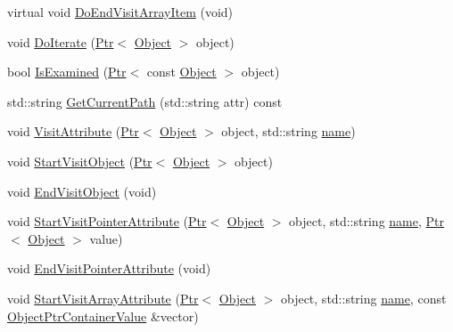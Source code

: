 \begin{DoxyCompactItemize}
\item 
virtual void \hyperlink{classns3_1_1AttributeIterator_a0c7b599cd2036e6eafccb2b341c7077c}{Do\+End\+Visit\+Array\+Item} (void)
\item 
void \hyperlink{classns3_1_1AttributeIterator_a01259d50f232e21c9c605547e26b34bb}{Do\+Iterate} (\hyperlink{classns3_1_1Ptr}{Ptr}$<$ \hyperlink{classns3_1_1Object}{Object} $>$ object)
\item 
bool \hyperlink{classns3_1_1AttributeIterator_a2875dc7947e54711f8529f59ee9e510e}{Is\+Examined} (\hyperlink{classns3_1_1Ptr}{Ptr}$<$ const \hyperlink{classns3_1_1Object}{Object} $>$ object)
\item 
std\+::string \hyperlink{classns3_1_1AttributeIterator_afbee28019196582ebe78a0c31ea89abc}{Get\+Current\+Path} (std\+::string attr) const 
\item 
void \hyperlink{classns3_1_1AttributeIterator_a43d0c36078a9b5c233102bc9daf5fed3}{Visit\+Attribute} (\hyperlink{classns3_1_1Ptr}{Ptr}$<$ \hyperlink{classns3_1_1Object}{Object} $>$ object, std\+::string \hyperlink{generate__test__data__lte__spectrum__model_8m_ab74e6bf80237ddc4109968cedc58c151}{name})
\item 
void \hyperlink{classns3_1_1AttributeIterator_a2702b2e4a022569d53ed28d263631d39}{Start\+Visit\+Object} (\hyperlink{classns3_1_1Ptr}{Ptr}$<$ \hyperlink{classns3_1_1Object}{Object} $>$ object)
\item 
void \hyperlink{classns3_1_1AttributeIterator_a7dce7fbd38eac6791990661c03ca1ff3}{End\+Visit\+Object} (void)
\item 
void \hyperlink{classns3_1_1AttributeIterator_ae64fc62245f72c257ef7d5b8e1f8caea}{Start\+Visit\+Pointer\+Attribute} (\hyperlink{classns3_1_1Ptr}{Ptr}$<$ \hyperlink{classns3_1_1Object}{Object} $>$ object, std\+::string \hyperlink{generate__test__data__lte__spectrum__model_8m_ab74e6bf80237ddc4109968cedc58c151}{name}, \hyperlink{classns3_1_1Ptr}{Ptr}$<$ \hyperlink{classns3_1_1Object}{Object} $>$ value)
\item 
void \hyperlink{classns3_1_1AttributeIterator_af9ce0540929ea6defa9bb675814760f4}{End\+Visit\+Pointer\+Attribute} (void)
\item 
void \hyperlink{classns3_1_1AttributeIterator_a5b850640b21a8ced46c4109be804a84a}{Start\+Visit\+Array\+Attribute} (\hyperlink{classns3_1_1Ptr}{Ptr}$<$ \hyperlink{classns3_1_1Object}{Object} $>$ object, std\+::string \hyperlink{generate__test__data__lte__spectrum__model_8m_ab74e6bf80237ddc4109968cedc58c151}{name}, const \hyperlink{classns3_1_1ObjectPtrContainerValue}{Object\+Ptr\+Container\+Value} \&vector)

\end{DoxyCompactItemize}
